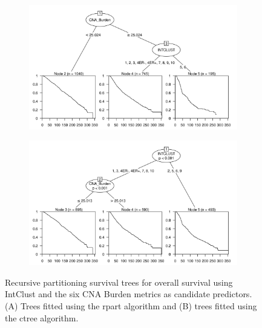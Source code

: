 \begin{figure}[!htb]
\centering

\vspace{0.5cm}

\begin{subfigure}{\textwidth}
\subcaption{}
\includegraphics[width=1\textwidth]{../figures/Appendices/Appendix_B/PartyKit_Survival_Burden_OS_INTCLUST.png}
\end{subfigure}

\vspace{2cm}

\begin{subfigure}{\textwidth}
\subcaption{}
\includegraphics[width=1\textwidth]{../figures/Appendices/Appendix_B/Ctree_Survival_Burden_OS_INTCLUST.png}
\end{subfigure}

\vspace{0.5cm}

\caption[Recursive partitioning survival trees for overall survival using IntClust and the six CNA Burden metrics as candidate predictors.]{Recursive partitioning survival trees for overall survival using IntClust and the six CNA Burden metrics as candidate predictors. (A) Trees fitted using the rpart algorithm and (B) trees fitted using the ctree algorithm.}
\end{figure}

